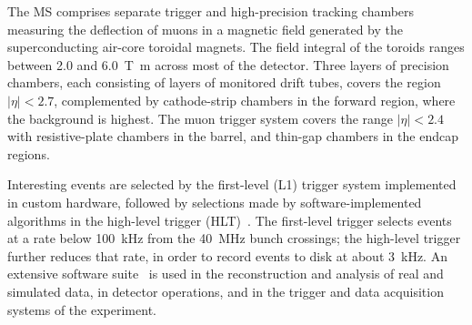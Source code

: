 The MS comprises separate trigger and
high-precision tracking chambers measuring the deflection of muons in a magnetic field generated by the superconducting air-core toroidal magnets.
The field integral of the toroids ranges between \num{2.0} and \SI{6.0}{\tesla\metre}
across most of the detector. 
Three layers of precision chambers, each consisting of layers of monitored drift tubes, covers the region \(|\eta| < 2.7\),
complemented by cathode-strip chambers in the forward region, where the background is highest.
The muon trigger system covers the range \(|\eta| < 2.4\) with resistive-plate chambers in the barrel, and thin-gap chambers in the endcap regions.

Interesting events are selected by the first-level (L1) trigger system implemented in custom hardware,
followed by selections made by software-implemented algorithms in the high-level trigger (HLT)~\cite{TRIG-2016-01}. 
The first-level trigger selects events at a rate below \SI{100}{\kHz} from the \SI{40}{\MHz} bunch crossings; the high-level trigger further reduces that rate, in order to record events to disk at about \SI{3}{\kHz}.
An extensive software suite~\cite{ATL-SOFT-PUB-2021-001} is used in the reconstruction and analysis of real
and simulated data, in detector operations, and in the trigger and data acquisition systems of the experiment.
